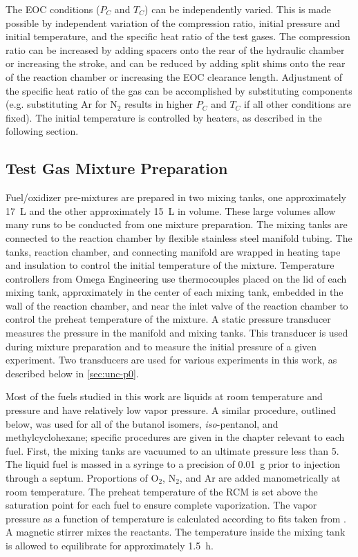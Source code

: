 \documentclass[../main.tex]{subfiles}
\begin{document}
The EOC conditions ($P_C$ and $T_C$) can be independently varied. This
is made possible by independent variation of the compression ratio,
initial pressure and initial temperature, and the specific heat ratio
of the test gases. The compression ratio can be
increased by adding spacers onto the rear of the hydraulic chamber or
increasing the stroke, and can be reduced by adding split shims onto
the rear of the reaction chamber or increasing the EOC clearance length.
Adjustment of the specific heat ratio of the gas can be accomplished
by substituting components (e.g. substituting Ar for N$_2$ results in
higher $P_C$ and $T_C$ if all other conditions are fixed). The initial
temperature is controlled by heaters, as described in the following
section.

\subsection{Test Gas Mixture Preparation}

Fuel/oxidizer pre-mixtures are prepared in two mixing tanks, one approximately
\SI{17}{\liter} and the other approximately \SI{15}{\liter} in volume. These large volumes allow many
runs to be conducted from one mixture preparation. The mixing tanks are connected
to the reaction chamber by flexible stainless steel manifold tubing. The tanks, reaction chamber,
and connecting manifold are wrapped in heating tape and insulation to control the initial
temperature of the mixture. Temperature controllers from Omega Engineering use thermocouples
placed on the lid of each mixing tank, approximately in the center of each mixing tank, embedded in
the wall of the reaction chamber, and near the inlet valve of the reaction chamber to control the
preheat temperature of the mixture. A static pressure transducer
measures the pressure in the manifold and mixing tanks. This transducer is used
during mixture preparation and to measure the initial pressure of a given experiment.
Two transducers are used for various experiments in this work, as described below
in \cref{sec:unc-p0}.

Most of the fuels studied in this work are liquids at room temperature and
pressure and have relatively low vapor pressure. A similar procedure, outlined
below, was used for all of the butanol isomers, \textit{iso}-pentanol, and
methylcyclohexane; specific procedures are given in the chapter relevant to
each fuel. First, the mixing tanks are vacuumed to an ultimate pressure
less than \SI{5}{\torr}. The liquid fuel is massed in a syringe to a precision of
\SI{0.01}{\gram} prior to injection through a septum. Proportions of O$_2$, N$_2$, and
Ar are added manometrically at room temperature. The preheat temperature of
the RCM is set above the saturation point for each fuel to ensure complete
vaporization. The vapor pressure as a function of temperature is calculated
according to fits taken from \textcite{Yaws1999}. A magnetic stirrer mixes
the reactants. The temperature inside the mixing tank is allowed to
equilibrate for approximately \SI{1.5}{\hour}.
\end{document}
